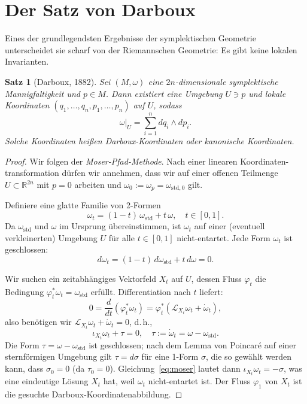\documentclass[12pt,a4paper]{amsart}
\newtheorem{theorem}{Satz}[section]
\theoremstyle{definition}
\begin{document}
\section{Der Satz von Darboux}
\label{sec:darboux}

Eines der grundlegendsten Ergebnisse der symplektischen Geometrie unterscheidet
sie scharf von der Riemannschen Geometrie: Es gibt keine lokalen Invarianten.

\begin{theorem}[Darboux, 1882]\label{thm:darboux}
Sei $(M, \omega)$ eine $2n$-dimensionale symplektische Mannigfaltigkeit und
$p \in M$.  Dann existiert eine Umgebung $U \ni p$ und lokale Koordinaten
$(q_1, \ldots, q_n, p_1, \ldots, p_n)$ auf $U$, sodass
\[
  \omega\big|_U = \sum_{i=1}^{n} dq_i \wedge dp_i.
\]
Solche Koordinaten heißen \emph{Darboux-Koordinaten} oder \emph{kanonische
Koordinaten}.
\end{theorem}

\begin{proof}
Wir folgen der \emph{Moser-Pfad-Methode}.  Nach einer linearen Koordinaten-
transformation dürfen wir annehmen, dass wir auf einer offenen Teilmenge
$U \subset \mathbb{R}^{2n}$ mit $p = 0$ arbeiten und
$\omega_0 := \omega_p = \omega_{\mathrm{std},0}$ gilt.

Definiere eine glatte Familie von 2-Formen
\[
  \omega_t = (1-t)\,\omega_{\mathrm{std}} + t\,\omega, \quad t \in [0,1].
\]
Da $\omega_{\mathrm{std}}$ und $\omega$ im Ursprung übereinstimmen, ist $\omega_t$
auf einer (eventuell verkleinerten) Umgebung $U$ für alle $t \in [0,1]$
nicht-entartet.  Jede Form $\omega_t$ ist geschlossen:
\[
  d\omega_t = (1-t)\,d\omega_{\mathrm{std}} + t\,d\omega = 0.
\]

Wir suchen ein zeitabhängiges Vektorfeld $X_t$ auf $U$, dessen Fluss
$\varphi_t$ die Bedingung $\varphi_t^* \omega_t = \omega_{\mathrm{std}}$
erfüllt.  Differentiation nach $t$ liefert:
\[
  0 = \frac{d}{dt}(\varphi_t^* \omega_t) = \varphi_t^*\!\left(
    \mathcal{L}_{X_t}\omega_t + \dot{\omega}_t \right),
\]
also benötigen wir $\mathcal{L}_{X_t}\omega_t + \dot{\omega}_t = 0$, d.\,h.,
\begin{equation}\label{eq:moser}
  \iota_{X_t} \omega_t + \tau = 0, \quad \tau := \dot{\omega}_t = \omega -
  \omega_{\mathrm{std}}.
\end{equation}
Die Form $\tau = \omega - \omega_{\mathrm{std}}$ ist geschlossen; nach dem
Lemma von Poincar\'{e} auf einer sternförmigen Umgebung gilt $\tau = d\sigma$
für eine 1-Form $\sigma$, die so gewählt werden kann, dass $\sigma_0 = 0$
(da $\tau_0 = 0$).  Gleichung~\eqref{eq:moser} lautet dann
$\iota_{X_t}\omega_t = -\sigma$, was eine eindeutige Lösung $X_t$ hat, weil
$\omega_t$ nicht-entartet ist.  Der Fluss $\varphi_1$ von $X_t$ ist die
gesuchte Darboux-Koordinatenabbildung.
\end{proof}
\end{document}
